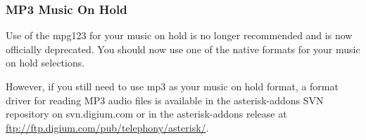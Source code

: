 \subsubsection{MP3 Music On Hold}

Use of the mpg123 for your music on hold is no longer recommended and is now
officially deprecated.  You should now use one of the native formats for your
music on hold selections.

However, if you still need to use mp3 as your music on hold format, a format
driver for reading MP3 audio files is available in the asterisk-addons SVN
repository on svn.digium.com or in the asterisk-addons release at
\url{ftp://ftp.digium.com/pub/telephony/asterisk/}.

